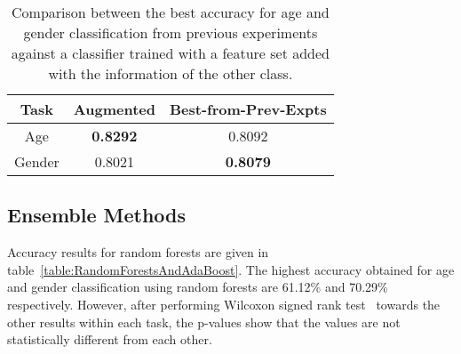 \documentclass[a4paper]{llncs}
\begin{document}
\begin{table}[!htbp]
\centering
\begin{tabular}{|c|cc|}
\hline
Task   & Augmented & Best-from-Prev-Expts \\ \hline
Age    & \textbf{0.8292}     & 0.8092               \\ 
Gender & 0.8021     & \textbf{0.8079}               \\ \hline
\end{tabular}
\caption{Comparison between the best accuracy for age and gender classification from previous experiments against a classifier trained with a feature set added with the information of the other class.}
\label{table:WithPriors}
\end{table}





\subsection{Ensemble Methods}
Accuracy results for random forests are given in table~\ref{table:RandomForestsAndAdaBoost}. The highest accuracy obtained for age and gender classification using random forests are 61.12\% and 70.29\% respectively. However, after performing Wilcoxon signed rank test~\cite{wilcoxon1945individual} towards the other results within each task, the p-values show that the values are not statistically different from each other.  
\end{document}
